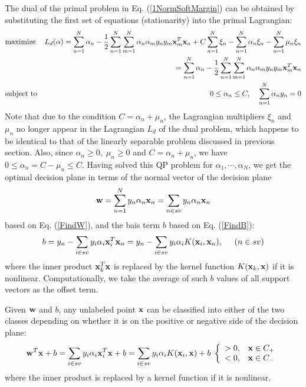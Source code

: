 \documentclass{article}
\begin{document}
The dual of the primal problem in Eq. (\ref{1NormSoftMargin}) can be 
obtained by substituting the first set of equations (stationarity) 
into the primal Lagrangian:
\begin{eqnarray}
  & \mbox{maximize} & L_d({\bf\alpha})=\sum_{n=1}^N\alpha_n
  -\frac{1}{2}\sum_{n=1}^N\sum_{m=1}^N \alpha_n\alpha_m y_ny_m{\bf x}_m^T{\bf x}_n
  +C\sum_{n=1}^N \xi_n-\sum_{n=1}^N \alpha_n\xi_n-\sum_{n=1}^N  \mu_n\xi_n 
  \nonumber \\
  && =\sum_{n=1}^N \alpha_n
  -\frac{1}{2}\sum_{n=1}^N \sum_{m=1}^N \alpha_n\alpha_my_ny_m {\bf x}_m^T{\bf x}_n
  \nonumber \\
  & \mbox{subject to} & 0 \le \alpha_n \le C,\;\;\;\;
  \sum_{n=1}^N \alpha_n y_n=0
  \label{SVMSM}
\end{eqnarray}
Note that due to the condition $C=\alpha_n+\mu_n$, the Lagrangian 
multipliers $\xi_n$ and $\mu_n$ no longer appear in the Lagrangian 
$L_d$ of the dual problem, which happens to be identical to that of 
the linearly separable problem discussed in previous section. Also, 
since $\alpha_n \ge 0,\;\mu_n \ge 0$ and $C=\alpha_n+\mu_n$, we have 
$0 \le \alpha_n =C-\mu_n \le C$. Having solved this QP problem for 
$\alpha_1,\cdots,\alpha_N$, we get the optimal decision plane in
terms of the normal vector of the decision plane
\begin{equation}
  {\bf w}=\sum_{n=1}^Ny_n\alpha_n{\bf x}_n
  =\sum_{n\in sv} y_n\alpha_n{\bf x}_n
\end{equation}
based on Eq. (\ref{FindW}), and the bais term $b$ based on
Eq. (\ref{FindB}):
\begin{equation}
  b=y_n-\sum_{i\in sv} y_i\alpha_i{\bf x}_i^T{\bf x}_n
  =y_n-\sum_{i\in sv} y_i\alpha_iK({\bf x}_i,{\bf x}_n),
  \;\;\;\;\;(n\in sv)
  \label{FindBkernel}
\end{equation}
where the inner product ${\bf x}_k^T{\bf x}$ is replaced by the 
kernel function $K({\bf x}_k,{\bf x})$ if it is nonlinear. 
Computationally, we take the average of such $b$ values of all 
support vectors as the offset term.

Given ${\bf w}$ and $b$, any unlabeled point ${\bf x}$ can be
classified into either of the two classes depending on whether it
is on the positive or negative side of the decision plane:
\begin{equation}
  {\bf w}^T{\bf x}+b=\sum_{i\in sv} y_i\alpha_i {\bf x}_i^T{\bf x}+b
  =\sum_{i\in sv} y_i\alpha_i K({\bf x}_i,{\bf x})+b\;
  \left\{ \begin{array}{ll}>0, & {\bf x}\in C_+\\
    <0, & {\bf x}\in C_-\end{array}\right.
    \label{ClassifyKernel}
\end{equation}
where the inner product is replaced by a kernel function if it is
nonlinear.
\end{document}

